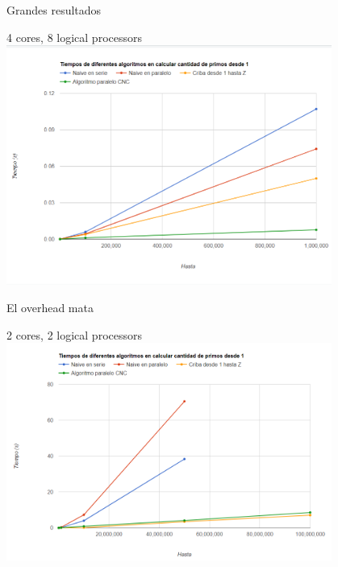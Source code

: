 \documentclass[compress]{beamer}
\begin{document}
\begin{frame}{Grandes resultados}
  \begin{center}
  {4 cores, 8 logical processors}
  \\
  \includegraphics[width=0.8\textwidth]{imagenes/principioJulian.png}%
  \end{center}
\end{frame}

\begin{frame}{El overhead mata}
  \begin{center}
  {2 cores, 2 logical processors}
  \\
  \includegraphics[width=0.8\textwidth]{imagenes/todoLucas.png}%
  \end{center}
\end{frame}
\end{document}
